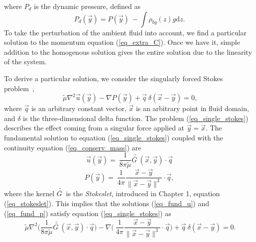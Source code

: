 	where $P_d$ is the dynamic pressure, defined as
\begin{equation}
	P_d (\vec{y})
	 = P (\vec{y}) \ - \int \rho_{bg}(z) g   \textrm{d}z.
	\label{eq_Pd}
\end{equation}
To take the perturbation of the ambient fluid into account, we find a particular solution to the momentum equation (\ref{eq_extra_C}). Once we have it, simple addition to the homogenous solution gives the entire solution due to the linearity of the system. 
\par
To derive a particular solution, we consider the singularly forced Stokes problem~\cite{pozrikidis_boundary_1992},
\begin{equation}
	\ \tilde{\mu} \nabla^2 \vec{u}(\vec{y})
	- \nabla P (\vec{y})
	+\vec{q} \ \delta \left(\vec{x} - \vec{y} \right) =0,
\label{eq_single_stokes}
\end{equation}
where $\vec{q}$ is an arbitrary constant vector, $\vec{x}$ is an arbitrary point in fluid domain, and $\delta$ is the three-dimensional delta function.
The problem (\ref{eq_single_stokes}) 
describes the effect coming from a singular force applied at $\vec{y} = \vec{x}.$
The fundamental solution to equation (\ref{eq_single_stokes}) coupled with the continuity equation (\ref{eq_conserv_mass}) are
\begin{equation}
	\vec{u} (\vec{y}) = \ \frac{1}{8\pi \tilde{\mu}}  \bar{\bar{G \ }}(\vec{x}, \vec{y})
	\cdot  \vec{q}
\label{eq_fund_u}
\end{equation}
\begin{equation}
	P (\vec{y}) = \ \frac{1}{4\pi }  
	\frac{\vec{x} - \vec{y}}{\| \vec{x} - \vec{y}\|^3}
	\cdot  \vec{q},
\label{eq_fund_p}
\end{equation}
where the kernel $\bar{\bar{G \ }}$ is the \textit{Stokeslet}, introduced in Chapter 1, equation (\ref{eq_stokeslet}).
This implies that the solutions (\ref{eq_fund_u}) and (\ref{eq_fund_p}) satisfy equation (\ref{eq_single_stokes}) as
\begin{equation}
	\ \tilde{\mu} \nabla^2 
	\biggl( \frac{1}{8\pi \tilde{\mu}}  \bar{\bar{G \ }}(\vec{x}, \vec{y})
	\cdot  \vec{q} \biggr)
	- \nabla \biggl(\ \frac{1}{4\pi }  
	\frac{\vec{x} - \vec{y}}{\| \vec{x} - \vec{y}\|^3}
	\cdot  \vec{q} \biggr)
	+ \vec{q} \ \delta \left(\vec{x} - \vec{y} \right)
	=0.
\label{eq_single_stokes_sub}
\end{equation}
